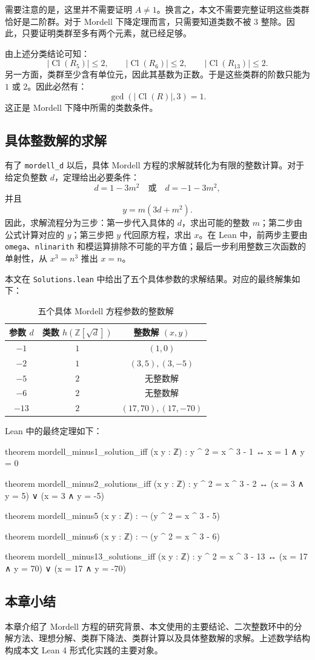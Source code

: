 需要注意的是，这里并不需要证明 \(A\ne1\)。换言之，本文不需要完整证明这些类群恰好是二阶群。对于 Mordell 下降定理而言，只需要知道类数不被 \(3\) 整除。因此，只要证明类群至多有两个元素，就已经足够。

由上述分类结论可知：
\[
|\operatorname{Cl}(R_5)|\le2,\qquad
|\operatorname{Cl}(R_6)|\le2,\qquad
|\operatorname{Cl}(R_{13})|\le2.
\]
另一方面，类群至少含有单位元，因此其基数为正数。于是这些类群的阶数只能为 \(1\) 或 \(2\)。因此必然有：
\[
\gcd(|\operatorname{Cl}(R)|,3)=1.
\]
这正是 Mordell 下降中所需的类数条件。

\subsection{具体整数解的求解}

有了 \texttt{mordell\_d} 以后，具体 Mordell 方程的求解就转化为有限的整数计算。对于给定负整数 \(d\)，定理给出必要条件：
\[
d=1-3m^2
\quad\text{或}\quad
d=-1-3m^2,
\]
并且
\[
y=m(3d+m^2).
\]
因此，求解流程分为三步：第一步代入具体的 \(d\)，求出可能的整数 \(m\)；第二步由公式计算对应的 \(y\)；第三步把 \(y\) 代回原方程，求出 \(x\)。在 Lean 中，前两步主要由 \texttt{omega}、\texttt{nlinarith} 和模运算排除不可能的平方值；最后一步利用整数三次函数的单射性，从 \(x^3=n^3\) 推出 \(x=n\)。

本文在 \texttt{Solutions.lean} 中给出了五个具体参数的求解结果。对应的最终解集如下：

\begin{table}[H]
\centering
\caption{五个具体 Mordell 方程参数的整数解}
\label{tab:mordell-solutions}
\begin{tabular}{ccc}
\toprule
参数 \(d\) & 类数 \(h(\mathbb Z[\sqrt d])\) & 整数解 \((x,y)\)\\
\midrule
\(-1\) & \(1\) & \((1,0)\)\\
\(-2\) & \(1\) & \((3,5),(3,-5)\)\\
\(-5\) & \(2\) & 无整数解\\
\(-6\) & \(2\) & 无整数解\\
\(-13\) & \(2\) & \((17,70),(17,-70)\)\\
\bottomrule
\end{tabular}
\end{table}

Lean 中的最终定理如下：
\begin{leanlisting}
theorem mordell_minus1_solution_iff (x y : ℤ) :
    y ^ 2 = x ^ 3 - 1 ↔ x = 1 ∧ y = 0

theorem mordell_minus2_solutions_iff (x y : ℤ) :
    y ^ 2 = x ^ 3 - 2 ↔
      (x = 3 ∧ y = 5) ∨ (x = 3 ∧ y = -5)

theorem mordell_minus5 (x y : ℤ) :
    ¬ (y ^ 2 = x ^ 3 - 5)

theorem mordell_minus6 (x y : ℤ) :
    ¬ (y ^ 2 = x ^ 3 - 6)

theorem mordell_minus13_solutions_iff (x y : ℤ) :
    y ^ 2 = x ^ 3 - 13 ↔ (x = 17 ∧ y = 70) ∨ (x = 17 ∧ y = -70)
\end{leanlisting}

\subsection{本章小结}

本章介绍了 Mordell 方程的研究背景、本文使用的主要结论、二次整数环中的分解方法、理想分解、类群下降法、类群计算以及具体整数解的求解。上述数学结构构成本文 Lean 4 形式化实践的主要对象。
